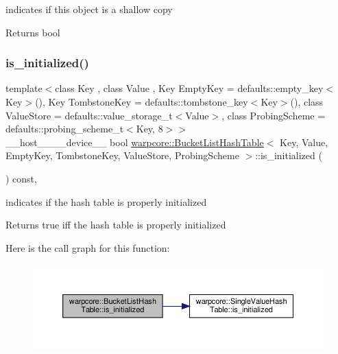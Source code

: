 indicates if this object is a shallow copy 

\begin{DoxyReturn}{Returns}
{\ttfamily bool} 
\end{DoxyReturn}
\mbox{\label{classwarpcore_1_1BucketListHashTable_abcfec81d3cac942d01868bb05080beab}} 
\subsubsection{\texorpdfstring{is\+\_\+initialized()}{is\_initialized()}}
{\footnotesize\ttfamily template$<$class Key , class Value , Key Empty\+Key = defaults\+::empty\+\_\+key$<$\+Key$>$(), Key Tombstone\+Key = defaults\+::tombstone\+\_\+key$<$\+Key$>$(), class Value\+Store  = defaults\+::value\+\_\+storage\+\_\+t$<$\+Value$>$, class Probing\+Scheme  = defaults\+::probing\+\_\+scheme\+\_\+t$<$\+Key, 8$>$$>$ \\
\+\_\+\+\_\+host\+\_\+\+\_\+\+\_\+\+\_\+device\+\_\+\+\_\+ bool \hyperlink{classwarpcore_1_1BucketListHashTable}{warpcore\+::\+Bucket\+List\+Hash\+Table}$<$ Key, Value, Empty\+Key, Tombstone\+Key, Value\+Store, Probing\+Scheme $>$\+::is\+\_\+initialized (\begin{DoxyParamCaption}{ }\end{DoxyParamCaption}) const\hspace{0.3cm}{\ttfamily [inline]}, {\ttfamily [noexcept]}}



indicates if the hash table is properly initialized 

\begin{DoxyReturn}{Returns}
{\ttfamily true} iff the hash table is properly initialized 
\end{DoxyReturn}
Here is the call graph for this function\+:
\nopagebreak
\begin{figure}[H]
\begin{center}
\leavevmode
\includegraphics[width=350pt]{classwarpcore_1_1BucketListHashTable_abcfec81d3cac942d01868bb05080beab_cgraph}
\end{center}
\end{figure}
\mbox{\label{classwarpcore_1_1BucketListHashTable_aa5a011b8623deb47def1b8e029869f06}} 
